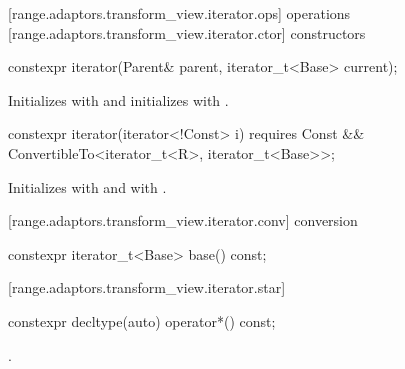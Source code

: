 [range.adaptors.transform_view.iterator.ops]{ operations}
[range.adaptors.transform_view.iterator.ctor]{ constructors}

\begin{itemdecl}
constexpr iterator(Parent& parent, iterator_t<Base> current);
\end{itemdecl}

\begin{itemdescr}
\pnum
\effects Initializes  with  and
initializes  with .
\end{itemdescr}

%
\begin{itemdecl}
constexpr iterator(iterator<!Const> i)
  requires Const && ConvertibleTo<iterator_t<R>, iterator_t<Base>>;
\end{itemdecl}

\begin{itemdescr}
\pnum
\effects Initializes  with  and 
with .
\end{itemdescr}

[range.adaptors.transform_view.iterator.conv]{ conversion}

\begin{itemdecl}
constexpr iterator_t<Base> base() const;
\end{itemdecl}

\begin{itemdescr}
\pnum
\oldtxt{\returns}  
\end{itemdescr}

[range.adaptors.transform_view.iterator.star]{}

\begin{itemdecl}
constexpr decltype(auto) operator*() const;
\end{itemdecl}

\begin{itemdescr}
\pnum
\returns {}.
\end{itemdescr}

